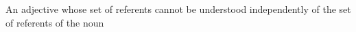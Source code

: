 An adjective whose set of referents cannot be understood independently of the set of referents of the noun
